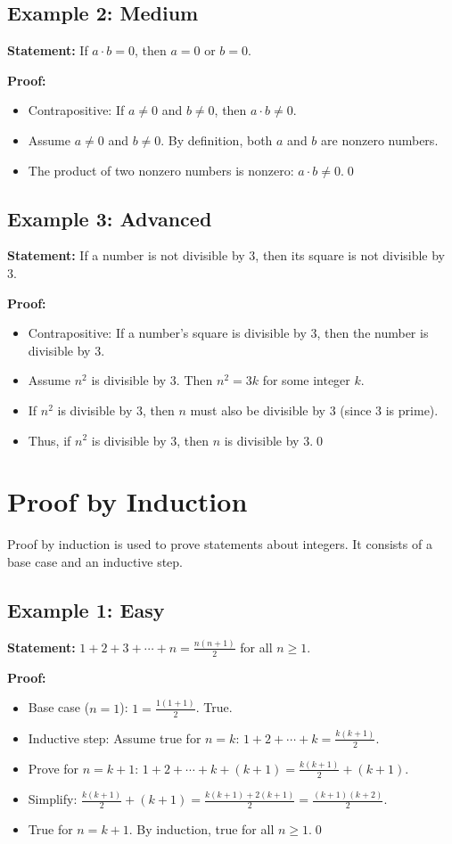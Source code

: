 \documentclass[12pt,a4paper]{article}
\begin{document}
\subsection{Example 2: Medium}
\textbf{Statement:} If $a \cdot b = 0$, then $a = 0$ or $b = 0$.

\textbf{Proof:}
\begin{itemize}
    \item Contrapositive: If $a \neq 0$ and $b \neq 0$, then $a \cdot b \neq 0$.
    \item Assume $a \neq 0$ and $b \neq 0$. By definition, both $a$ and $b$ are nonzero numbers.
    \item The product of two nonzero numbers is nonzero: $a \cdot b \neq 0$.\qed
\end{itemize}

\subsection{Example 3: Advanced}
\textbf{Statement:} If a number is not divisible by 3, then its square is not divisible by 3.

\textbf{Proof:}
\begin{itemize}
    \item Contrapositive: If a number's square is divisible by 3, then the number is divisible by 3.
    \item Assume $n^2$ is divisible by 3. Then $n^2 = 3k$ for some integer $k$.
    \item If $n^2$ is divisible by 3, then $n$ must also be divisible by 3 (since 3 is prime).
    \item Thus, if $n^2$ is divisible by 3, then $n$ is divisible by 3.\qed
\end{itemize}

\newpage

\section{Proof by Induction}
Proof by induction is used to prove statements about integers. It consists of a base case and an inductive step.

\subsection{Example 1: Easy}
\textbf{Statement:} $1 + 2 + 3 + \cdots + n = \frac{n(n+1)}{2}$ for all $n \geq 1$.

\textbf{Proof:}
\begin{itemize}
    \item Base case ($n=1$): $1 = \frac{1(1+1)}{2}$. True.
    \item Inductive step: Assume true for $n=k$: $1+2+\cdots+k = \frac{k(k+1)}{2}$.
    \item Prove for $n=k+1$: $1+2+\cdots+k+(k+1) = \frac{k(k+1)}{2} + (k+1)$.
    \item Simplify: $\frac{k(k+1)}{2} + (k+1) = \frac{k(k+1) + 2(k+1)}{2} = \frac{(k+1)(k+2)}{2}$.
    \item True for $n=k+1$. By induction, true for all $n\geq1$.\qed
\end{itemize}
\end{document}
